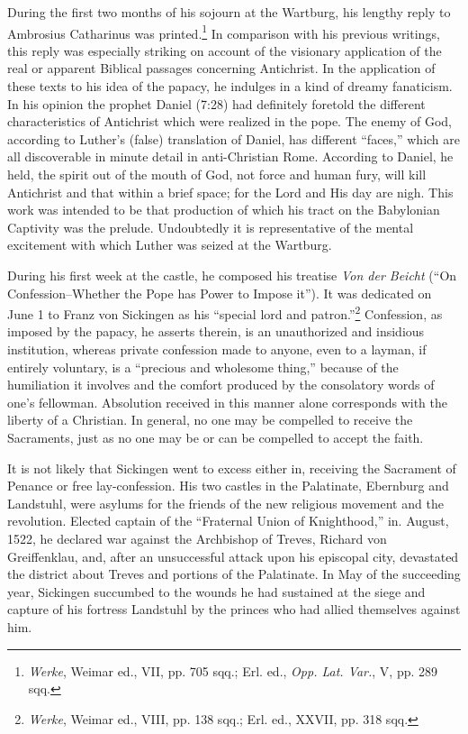During the first two months of his sojourn at the Wartburg, his
lengthy reply to Ambrosius Catharinus was printed.\footnote{\textit{Werke}, Weimar ed., VII, pp. 705 sqq.; Erl. ed., \textit{Opp. Lat. Var.}, V, pp. 289 sqq.}
In comparison
with his previous writings, this reply was especially striking on account
of the visionary application of the real or apparent Biblical
passages concerning Antichrist. In the application of these texts
to his idea of the papacy, he indulges in a kind of dreamy fanaticism.
In his opinion the prophet Daniel (7:28) had definitely foretold
the different characteristics of Antichrist which were realized in
the pope. The enemy of God, according to Luther’s (false) translation of
Daniel, has different “faces,” which are all discoverable in
minute detail in anti-Christian Rome. According to Daniel, he held,
the spirit out of the mouth of God, not force and human fury, will
kill Antichrist and that within a brief space; for the Lord and
His day are nigh. This work was intended to be that production of
which his tract on the Babylonian Captivity was the prelude. Undoubtedly
it is representative of the mental excitement with which
Luther was seized at the Wartburg.

During his first week at the castle, he composed his treatise \textit{Von
der Beicht} (“On Confession--Whether the Pope has Power to Impose
it”). It was dedicated on June 1 to Franz von Sickingen as
his “special lord and patron.”\footnote{\textit{Werke}, Weimar ed., VIII, pp. 138 sqq.; Erl. ed., XXVII, pp. 318 sqq.}
Confession, as imposed by the papacy,
he asserts therein, is an unauthorized and insidious institution, whereas
private confession made to anyone, even to a layman, if entirely
voluntary, is a “precious and wholesome thing,” because of the
humiliation it involves and the comfort produced by the consolatory
words of one’s fellowman. Absolution received in this manner alone
corresponds with the liberty of a Christian. In general, no one may
be compelled to receive the Sacraments, just as no one may be or can
be compelled to accept the faith.

It is not likely that Sickingen went to excess either in, receiving
the Sacrament of Penance or free lay-confession. His two castles
in the Palatinate, Ebernburg and Landstuhl, were asylums for the
friends of the new religious movement and the revolution. Elected
captain of the “Fraternal Union of Knighthood,” in. August, 1522,
he declared war against the Archbishop of Treves, Richard von
Greiffenklau, and, after an unsuccessful attack upon his episcopal
city, devastated the district about Treves and portions of the Palatinate.
In May of the succeeding year, Sickingen succumbed to the
wounds he had sustained at the siege and capture of his fortress
Landstuhl by the princes who had allied themselves against him.

